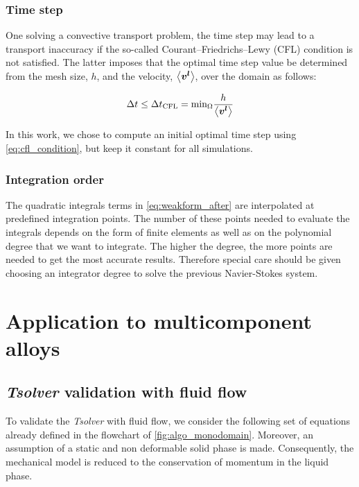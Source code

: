 \subsubsection{Time step}

One solving a convective transport problem, the time step may lead to a transport inaccuracy
if the so-called Courant–Friedrichs–Lewy (CFL) condition is not satisfied. The latter imposes that
the optimal time step value be determined from the mesh size, $h$, and the velocity, $\left \langle \boldsymbol{v^l} \right \rangle$, over the domain as follows:

\begin{align}
\label{eq:cfl_condition}
\Delta t \leq \Delta t_\text{CFL} = \text{min}_\Omega \frac{h}{\left \langle \boldsymbol{v^l} \right \rangle}
\end{align}

In this work, we chose to compute an initial optimal time step using \cref{eq:cfl_condition}, but keep it
constant for all simulations.

\subsubsection{Integration order}

The quadratic integrals terms in \cref{eq:weakform_after} are interpolated at predefined integration points.
The number of these points needed to evaluate the integrals depends on the form of finite elements
as well as on the polynomial degree that we want to integrate. The higher the degree, the more points 
are needed to get the most accurate results. Therefore special care should be given choosing an integrator
degree to solve the previous Navier-Stokes system.


\section{Application to multicomponent alloys}

\subsection{\emph{Tsolver} validation with fluid flow}

To validate the \emph{Tsolver} with fluid flow, we consider the following set of equations
already defined in the flowchart of \cref{fig:algo_monodomain}. Moreover, an assumption 
of a static and non deformable solid phase is made. Consequently, the mechanical model is 
reduced to the conservation of momentum in the liquid phase. 

